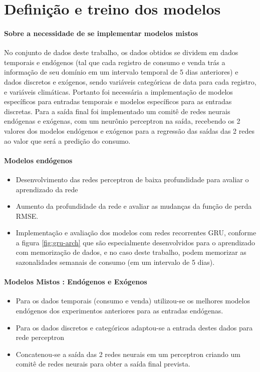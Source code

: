     \section{Definição e treino dos modelos}
            \paragraph*{Sobre a necessidade de se implementar modelos mistos}
                No conjunto de dados deste trabalho, os dados obtidos se dividem em dados temporais e endógenos (tal que cada registro de consumo e venda trás a informação de seu domínio em um intervalo temporal de 5 dias anteriores) e dados discretos e exógenos, sendo variáveis categóricas de data para cada registro, e variáveis climáticas.
                Portanto foi necessária a implementação de modelos específicos para entradas temporais e modelos específicos para as entradas discretas.
                Para a saída final foi implementado um comitê de redes neurais endógenas e exógenas, com um neurônio perceptron na saída, recebendo os 2 valores dos modelos endógenos e exógenos para a regressão das saídas das 2 redes ao valor que será a predição do consumo.
         	\paragraph{Modelos endógenos}
         	\begin{itemize}
                \item	Desenvolvimento das redes perceptron de baixa profundidade para avaliar o aprendizado da rede
                \item	Aumento da profundidade da rede e avaliar as mudanças da função de perda RMSE. 
                \item	Implementação e avaliação dos modelos com redes recorrentes GRU, conforme a figura \ref{fig:gru-arch} que são especialmente desenvolvidos para o aprendizado com memorização de dados, e no caso deste trabalho, podem memorizar as sazonalidades semanais de consumo (em um intervalo de 5 dias).
            \end{itemize}
            \paragraph{Modelos Mistos : Endógenos e Exógenos}
                \begin{itemize}
                    \item Para os dados temporais (consumo e venda) utilizou-se os melhores modelos endógenos dos experimentos anteriores para as entradas endógenas. 
                    \item Para os dados discretos e categóricos adaptou-se a entrada destes dados para rede perceptron
                    \item  Concatenou-se a saída das 2 redes neurais em um perceptron criando um comitê de redes neurais para obter a saída final prevista.
                \end{itemize}
            
